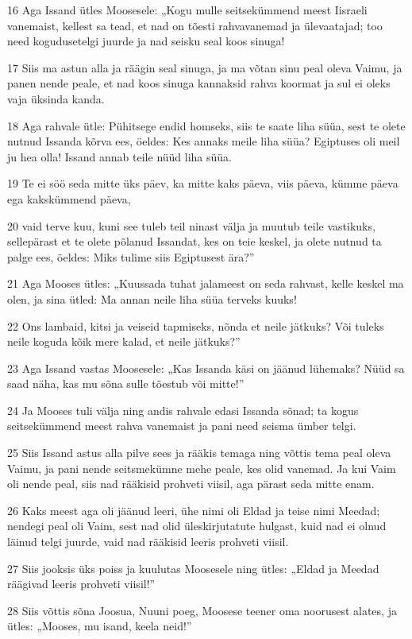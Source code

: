 \par 16 Aga Issand ütles Moosesele: „Kogu mulle seitsekümmend meest Iisraeli vanemaist, kellest sa tead, et nad on tõesti rahvavanemad ja ülevaatajad; too need kogudusetelgi juurde ja nad seisku seal koos sinuga!
\par 17 Siis ma astun alla ja räägin seal sinuga, ja ma võtan sinu peal oleva Vaimu, ja panen nende peale, et nad koos sinuga kannaksid rahva koormat ja sul ei oleks vaja üksinda kanda.
\par 18 Aga rahvale ütle: Pühitsege endid homseks, siis te saate liha süüa, sest te olete nutnud Issanda kõrva ees, öeldes: Kes annaks meile liha süüa? Egiptuses oli meil ju hea olla! Issand annab teile nüüd liha süüa.
\par 19 Te ei söö seda mitte üks päev, ka mitte kaks päeva, viis päeva, kümme päeva ega kakskümmend päeva,
\par 20 vaid terve kuu, kuni see tuleb teil ninast välja ja muutub teile vastikuks, sellepärast et te olete põlanud Issandat, kes on teie keskel, ja olete nutnud ta palge ees, öeldes: Miks tulime siis Egiptusest ära?”
\par 21 Aga Mooses ütles: „Kuussada tuhat jalameest on seda rahvast, kelle keskel ma olen, ja sina ütled: Ma annan neile liha süüa terveks kuuks!
\par 22 Ons lambaid, kitsi ja veiseid tapmiseks, nõnda et neile jätkuks? Või tuleks neile koguda kõik mere kalad, et neile jätkuks?”
\par 23 Aga Issand vastas Moosesele: „Kas Issanda käsi on jäänud lühemaks? Nüüd sa saad näha, kas mu sõna sulle tõestub või mitte!”
\par 24 Ja Mooses tuli välja ning andis rahvale edasi Issanda sõnad; ta kogus seitsekümmend meest rahva vanemaist ja pani need seisma ümber telgi.
\par 25 Siis Issand astus alla pilve sees ja rääkis temaga ning võttis tema peal oleva Vaimu, ja pani nende seitsmekümne mehe peale, kes olid vanemad. Ja kui Vaim oli nende peal, siis nad rääkisid prohveti viisil, aga pärast seda mitte enam.
\par 26 Kaks meest aga oli jäänud leeri, ühe nimi oli Eldad ja teise nimi Meedad; nendegi peal oli Vaim, sest nad olid üleskirjutatute hulgast, kuid nad ei olnud läinud telgi juurde, vaid nad rääkisid leeris prohveti viisil.
\par 27 Siis jooksis üks poiss ja kuulutas Moosesele ning ütles: „Eldad ja Meedad räägivad leeris prohveti viisil!”
\par 28 Siis võttis sõna Joosua, Nuuni poeg, Moosese teener oma noorusest alates, ja ütles: „Mooses, mu isand, keela neid!”
